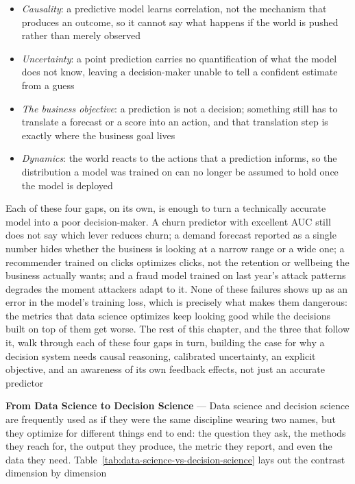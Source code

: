 \begin{itemize}
  \item \emph{Causality}: a predictive model learns correlation, not the
    mechanism that produces an outcome, so it cannot say what happens if the world
    is pushed rather than merely observed

  \item \emph{Uncertainty}: a point prediction carries no quantification of what
    the model does not know, leaving a decision-maker unable to tell a confident
    estimate from a guess

  \item \emph{The business objective}: a prediction is not a decision; something
    still has to translate a forecast or a score into an action, and that translation
    step is exactly where the business goal lives

  \item \emph{Dynamics}: the world reacts to the actions that a prediction informs,
    so the distribution a model was trained on can no longer be assumed to hold
    once the model is deployed
\end{itemize}

Each of these four gaps, on its own, is enough to turn a technically accurate
model into a poor decision-maker. A churn predictor with excellent AUC still does
not say which lever reduces churn; a demand forecast reported as a single number
hides whether the business is looking at a narrow range or a wide one; a recommender
trained on clicks optimizes clicks, not the retention or wellbeing the business
actually wants; and a fraud model trained on last year's attack patterns degrades
the moment attackers adapt to it. None of these failures shows up as an error in
the model's training loss, which is precisely what makes them dangerous: the
metrics that data science optimizes keep looking good while the decisions built
on top of them get worse. The rest of this chapter, and the three that follow it,
walk through each of these four gaps in turn, building the case for why a
decision system needs causal reasoning, calibrated uncertainty, an explicit
objective, and an awareness of its own feedback effects, not just an accurate
predictor

\textbf{From Data Science to Decision Science} --- Data science and decision
science are frequently used as if they were the same discipline wearing two
names, but they optimize for different things end to end: the question they ask,
the methods they reach for, the output they produce, the metric they report, and
even the data they need. Table~\ref{tab:data-science-vs-decision-science} lays out
the contrast dimension by dimension

